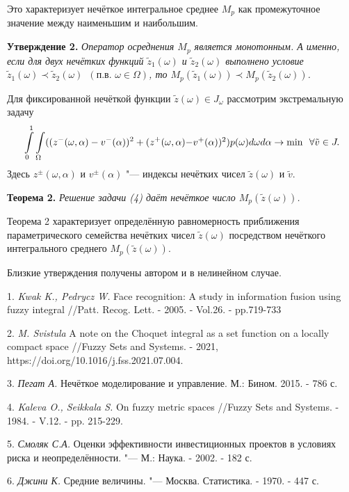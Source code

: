 Это характеризует нечёткое интегральное среднее $M_p$ как промежуточное значение между наименьшим и наибольшим.

\textbf{Утверждение  2.} \textit{Оператор осреднения $M_p$ является монотонным. А именно, если для двух нечётких функций $\tilde{z}_1(\omega)$ и  $\tilde{z}_2(\omega)$ выполнено условие  $\tilde{z}_1(\omega)\prec\tilde{z}_2(\omega)$\,\,\,$(\text{п.в.}\,\,\omega\in\Omega)$, то $M_p(\tilde{z}_1(\omega))\prec M_p(\tilde{z}_2(\omega))$.
}


Для фиксированной нечёткой функции $\tilde{z}(\omega)\in J_{\omega}$ рассмотрим экстремальную задачу
\begin{equation}
\int\limits_{0}^1\int\limits_{\Omega}((z^{-}(\omega, \alpha) - v^{-}(\alpha))^2 + (z^{+}(\omega, \alpha) $$$$- v^{+}(\alpha))^2)p(\omega)d\omega d\alpha\rightarrow\min\,\,\,\forall \tilde{v}\in J.
\end{equation}
Здесь $z^{\pm}(\omega, \alpha)$ и  $v^{\pm}(\alpha)$  "--- индексы нечётких  чисел $\tilde{z}(\omega)$ и  $\tilde{v}$.

\textbf{Теорема 2.} \textit{Решение задачи (4) даёт нечёткое число  $M_p(\tilde{z}(\omega))$. }


Теорема 2  характеризует определённую равномерность приближения параметрического семейства нечётких чисел $\tilde{z}(\omega)$ посредством нечёткого интегрального среднего $M_p(\tilde{z}(\omega))$.

Близкие  утверждения получены автором и в нелинейном случае.



\litlist

1. {\it Kwak K., Pedrycz W.}
Face recognition: A study in information fusion using fuzzy integral //Patt. Recog. Lett. - 2005. - Vol.26. - pp.719-733

2. {\it M. Svistula}
A note on the Choquet integral as a set function on a locally compact space //Fuzzy Sets and Systems. - 2021, https://doi.org/10.1016/j.fss.2021.07.004.

3. {\it Пегат А.}
Нечёткое моделирование и управление.  М.: Бином. 2015. - 786 с.

4. {\it Kaleva O., Seikkala S.}
On fuzzy metric spaces //Fuzzy Sets and Systems. - 1984. - V.12. - pp. 215-229.

5. {\it Смоляк С.А.}
Оценки эффективности инвестиционных проектов в условиях риска и неопределённости. "--- М.: Наука. - 2002. - 182 с.

6. {\it Джини К. }
Средние величины. "--- Москва. Статистика. -  1970. - 447 с.
